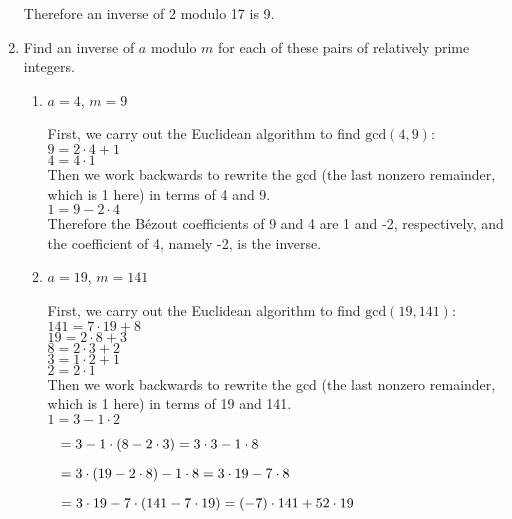 \documentclass[11pt]{article}
\begin{document}
\begin{enumerate}[label=\textbf{\arabic*.}]
	Therefore an inverse of 2 modulo 17 is 9.
	
	\item Find an inverse of $a$ modulo $m$ for each of these pairs of relatively prime integers.
	
	\begin{enumerate}[label=\textbf{\alph*)}]
		\item $a = 4$, $m = 9$
		
		First, we carry out the Euclidean algorithm to find $\text{gcd}(4, 9)$: \\
		
		$9 = 2 \cdot 4 + 1$ \\
		$4 = 4 \cdot 1$ \\
		
		Then we work backwards to rewrite the gcd (the last nonzero remainder, which is 1 here) in terms of 4 and 9. \\
		
		$1 = 9 - 2 \cdot 4$ \\
		
		Therefore the B\'ezout coefficients of 9 and 4 are 1 and -2, respectively, and the coefficient of 4, namely -2, is the inverse.
		
		\item $a = 19$, $m = 141$
		
		First, we carry out the Euclidean algorithm to find $\text{gcd}(19, 141)$: \\
		
		$141 = 7 \cdot 19 + 8$ \\
		$19 = 2 \cdot 8 + 3$ \\
		$8 = 2 \cdot 3 + 2$ \\
		$3 = 1 \cdot 2 + 1$ \\
		$2 = 2 \cdot 1$ \\
		
		Then we work backwards to rewrite the gcd (the last nonzero remainder, which is 1 here) in terms of 19 and 141. \\
		
		$1 = 3 - 1 \cdot 2$

		$\hspace{0.3cm} = 3 - 1 \cdot (8 - 2 \cdot 3) = 3 \cdot 3 - 1 \cdot 8$
		
		$\hspace{0.3cm} = 3 \cdot (19 - 2 \cdot 8) - 1 \cdot 8 = 3 \cdot 19 - 7 \cdot 8$
		
		$\hspace{0.3cm} = 3 \cdot 19 - 7 \cdot (141 - 7 \cdot 19) = (-7) \cdot 141 + 52 \cdot 19$ \\
		

\end{enumerate}
\end{enumerate}
\end{document}
